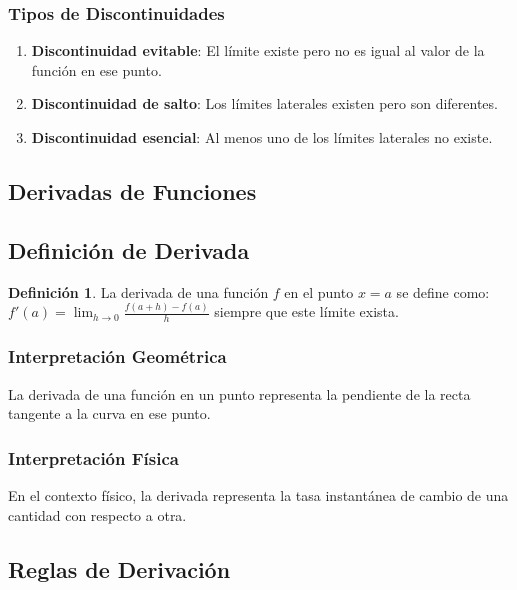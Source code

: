 \documentclass[12pt, a4paper, oneside]{book}
\theoremstyle{definition}
\newtheorem{definicion}{Definición}[chapter]
\begin{document}
\subsubsection{Tipos de Discontinuidades}

\begin{enumerate}
    \item \textbf{Discontinuidad evitable}: El límite existe pero no es igual al valor de la función en ese punto.
    \item \textbf{Discontinuidad de salto}: Los límites laterales existen pero son diferentes.
    \item \textbf{Discontinuidad esencial}: Al menos uno de los límites laterales no existe.
\end{enumerate}

\subsection{Derivadas de Funciones}

\subsection{Definición de Derivada}

\begin{definicion}
La derivada de una función $f$ en el punto $x = a$ se define como:
$f'(a) = \lim_{h \to 0} \frac{f(a + h) - f(a)}{h}$
siempre que este límite exista.
\end{definicion}

\subsubsection{Interpretación Geométrica}

La derivada de una función en un punto representa la pendiente de la recta tangente a la curva en ese punto.

\subsubsection{Interpretación Física}

En el contexto físico, la derivada representa la tasa instantánea de cambio de una cantidad con respecto a otra.

\subsection{Reglas de Derivación}
\end{document}
